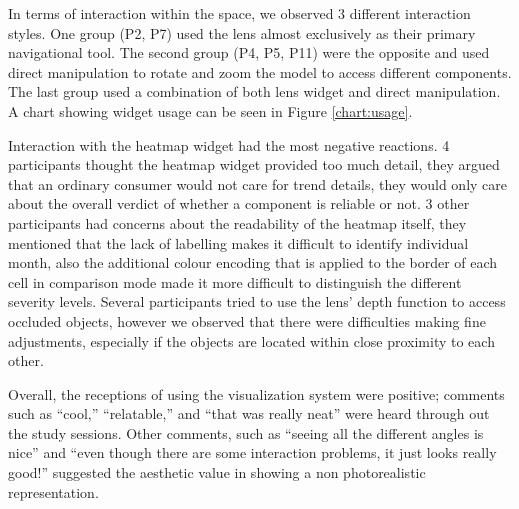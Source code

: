    
In terms of interaction within the \threed space, we observed 3 different
interaction styles. One group (P2, P7) used the lens almost exclusively
as their primary navigational tool. The second group (P4, P5, P11) were the
opposite and used direct manipulation to rotate and zoom the \threed model to
access different components. The last group used a combination of both lens
widget and direct manipulation. A chart showing widget usage can be seen in
Figure \ref{chart:usage}.

Interaction with the heatmap widget had the most negative reactions. 4
participants thought the heatmap widget provided too much detail, they argued
that an ordinary consumer would not care for trend details, they would only care
about the overall verdict of whether a component is reliable or not. 3 other
participants had concerns about the readability of the heatmap itself, they
mentioned that the lack of labelling makes it difficult to identify individual
month, also the additional colour encoding that is applied to the border of each
cell in comparison mode made it more difficult to distinguish the different
severity levels. Several participants tried to use the lens' depth function to access occluded
objects, however we observed that there were difficulties making fine
adjustments, especially if the objects are located within close proximity to
each other.
  
Overall, the receptions of using the visualization system were positive;
comments such as ``cool,'' ``relatable,'' and ``that was really neat'' were heard
through out the study sessions. Other comments, such as ``seeing all the different angles is
nice'' and ``even though there are some interaction problems, it just looks
really good!'' suggested the aesthetic value in showing a non photorealistic \threed
representation.  
  